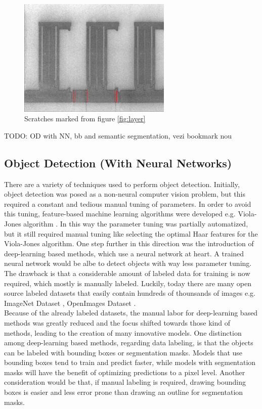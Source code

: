 \begin{figure}[ht]
  \includegraphics[width=0.65\textwidth]{images/layer_00325_marked_cropped}
  \centering
  \caption{Scratches marked from figure \ref{fig:layer}}
  \label{fig:layer_00325_marked_cropped}
\end{figure}

TODO: OD with NN, bb and semantic segmentation, vezi bookmark nou
\subsection{Object Detection (With Neural Networks)}
There are a variety of techniques used to perform object detection. Initially, object detection was posed as a non-neural computer vision problem, but this required a constant and tedious manual tuning of parameters. In order to avoid this tuning, feature-based machine learning algorithms were developed e.g. Viola-Jones algorithm \cite{viola_joines_paper}. In this way the parameter tuning was partially automatized, but it still required manual tuning like selecting the optimal Haar features for the Viola-Jones algorithm.
One step further in this direction was the introduction of deep-learning based methods, which use a neural network at heart. A trained neural network would be albe to detect objects with way less parameter tuning. The drawback is that a considerable amount of labeled data for training is now required, which mostly is manually labeled. Luckily, today there are many open source labeled datasets that easily contain hundreds of thounsands of images e.g. ImageNet Dataset \cite{imagenet_site}, OpenImages Dataset \cite{openimages_site}. \\
Because of the already labeled datasets, the manual labor for deep-learning based methods was greatly reduced and the focus shifted towards those kind of methods, leading to the creation of many innovative models. One distinction among deep-learning based methods, regarding data labeling, is that the objects can be labeled with bounding boxes or segmentation masks. Models that use bounding boxes tend to train and predict faster, while models with segmentation masks will have the benefit of optimizing predictions to a pixel level. Another consideration would be that, if manual labeling is required, drawing bounding boxes is easier and less error prone than drawing an outline for segmentation masks. \\

